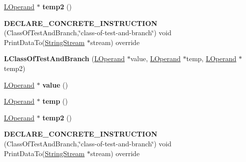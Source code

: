 \begin{DoxyCompactItemize}
\item 
\hyperlink{classv8_1_1internal_1_1_l_operand}{L\+Operand} $\ast$ {\bfseries temp2} ()\hypertarget{classv8_1_1internal_1_1_l_class_of_test_and_branch_af359fb93d557818c0be046f117352321}{}\label{classv8_1_1internal_1_1_l_class_of_test_and_branch_af359fb93d557818c0be046f117352321}

\item 
{\bfseries D\+E\+C\+L\+A\+R\+E\+\_\+\+C\+O\+N\+C\+R\+E\+T\+E\+\_\+\+I\+N\+S\+T\+R\+U\+C\+T\+I\+ON} (Class\+Of\+Test\+And\+Branch,\char`\"{}class-\/of-\/test-\/and-\/branch\char`\"{}) void Print\+Data\+To(\hyperlink{classv8_1_1internal_1_1_string_stream}{String\+Stream} $\ast$stream) override\hypertarget{classv8_1_1internal_1_1_l_class_of_test_and_branch_a029c33ea762efee5c0e2f13b702a3b6f}{}\label{classv8_1_1internal_1_1_l_class_of_test_and_branch_a029c33ea762efee5c0e2f13b702a3b6f}

\item 
{\bfseries L\+Class\+Of\+Test\+And\+Branch} (\hyperlink{classv8_1_1internal_1_1_l_operand}{L\+Operand} $\ast$value, \hyperlink{classv8_1_1internal_1_1_l_operand}{L\+Operand} $\ast$temp, \hyperlink{classv8_1_1internal_1_1_l_operand}{L\+Operand} $\ast$temp2)\hypertarget{classv8_1_1internal_1_1_l_class_of_test_and_branch_a2382ed2b11f09f3de3e6fa9741e0c7f3}{}\label{classv8_1_1internal_1_1_l_class_of_test_and_branch_a2382ed2b11f09f3de3e6fa9741e0c7f3}

\item 
\hyperlink{classv8_1_1internal_1_1_l_operand}{L\+Operand} $\ast$ {\bfseries value} ()\hypertarget{classv8_1_1internal_1_1_l_class_of_test_and_branch_a701d1d88a41fd46c94cc2d33ec5093b6}{}\label{classv8_1_1internal_1_1_l_class_of_test_and_branch_a701d1d88a41fd46c94cc2d33ec5093b6}

\item 
\hyperlink{classv8_1_1internal_1_1_l_operand}{L\+Operand} $\ast$ {\bfseries temp} ()\hypertarget{classv8_1_1internal_1_1_l_class_of_test_and_branch_ad6879400ca43794c61f3e6ac2829ddab}{}\label{classv8_1_1internal_1_1_l_class_of_test_and_branch_ad6879400ca43794c61f3e6ac2829ddab}

\item 
\hyperlink{classv8_1_1internal_1_1_l_operand}{L\+Operand} $\ast$ {\bfseries temp2} ()\hypertarget{classv8_1_1internal_1_1_l_class_of_test_and_branch_af359fb93d557818c0be046f117352321}{}\label{classv8_1_1internal_1_1_l_class_of_test_and_branch_af359fb93d557818c0be046f117352321}

\item 
{\bfseries D\+E\+C\+L\+A\+R\+E\+\_\+\+C\+O\+N\+C\+R\+E\+T\+E\+\_\+\+I\+N\+S\+T\+R\+U\+C\+T\+I\+ON} (Class\+Of\+Test\+And\+Branch,\char`\"{}class-\/of-\/test-\/and-\/branch\char`\"{}) void Print\+Data\+To(\hyperlink{classv8_1_1internal_1_1_string_stream}{String\+Stream} $\ast$stream) override\hypertarget{classv8_1_1internal_1_1_l_class_of_test_and_branch_a029c33ea762efee5c0e2f13b702a3b6f}{}\label{classv8_1_1internal_1_1_l_class_of_test_and_branch_a029c33ea762efee5c0e2f13b702a3b6f}

\end{DoxyCompactItemize}
